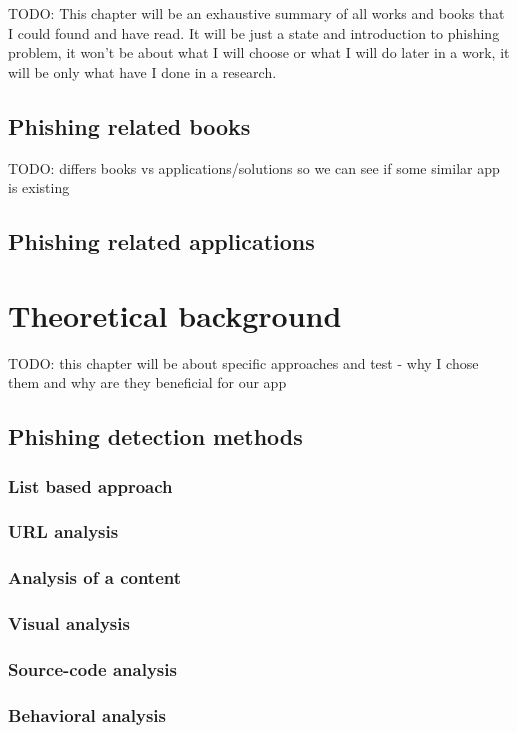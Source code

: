 \documentclass[
  digital, %
  twoside, %
  table,   %
  nolof,     %
  nolot,     %
]{fithesis3}
\begin{document}
TODO: This chapter will be an exhaustive summary of all works and books that I could found and have read. It will be just a state and introduction to phishing problem, it won't be about what I will choose or what I will do later in a work, it will be only what have I done in a research.
\section{Phishing related books}
TODO: differs books vs applications/solutions so we can see if some similar app is existing
\section{Phishing related applications}

\chapter{Theoretical background}
TODO: this chapter will be about specific approaches and test - why I chose them and why are they beneficial for our app

\section{Phishing detection methods}
\subsection{List based approach}
\subsection{URL analysis}
\subsection{Analysis of a content}
\subsection{Visual analysis}
\subsection{Source-code analysis}
\subsection{Behavioral analysis}
\end{document}
